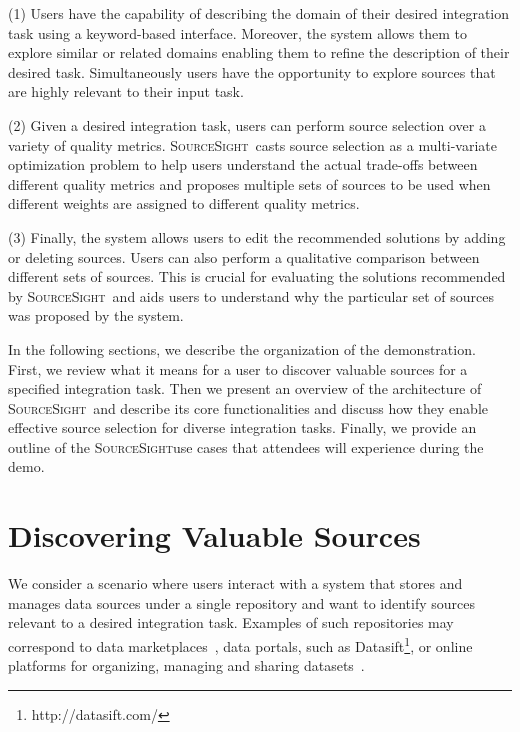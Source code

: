 \documentclass{vldb}
\newcommand\system{\textsc{SourceSight}}
\begin{document}
\vspace{5pt}\noindent (1) Users have the capability of describing the domain of their desired integration task using a keyword-based interface. Moreover, the system allows them to explore similar or related domains enabling them to refine the description of their desired task. Simultaneously users have the opportunity to explore sources that are highly relevant to their input task.

\vspace{5pt}\noindent (2) Given a desired integration task, users can perform source selection over a variety of quality metrics. \system~casts source selection as a multi-variate optimization problem to help users understand the actual trade-offs between different quality metrics and proposes multiple sets of sources to be used when different weights are assigned to different quality metrics. 

\vspace{5pt}\noindent (3) Finally, the system allows users to edit the recommended solutions by adding or deleting sources. Users can also perform a qualitative comparison between different sets of sources. This is crucial for evaluating the solutions recommended by \system~and aids users to understand why the particular set of sources was proposed by the system.

In the following sections, we describe the organization of the demonstration. First, we review what it means for a user to discover valuable sources for a specified integration task. Then we present an overview of the architecture of \system~and describe its core functionalities and discuss how they enable effective source selection for diverse integration tasks. Finally, we provide an outline of the \system use cases that attendees will experience during the demo.

\section{Discovering Valuable Sources}
\label{sec:sources}
We consider a scenario where users interact with a system that stores and manages data sources under a single repository and want to identify sources relevant to a desired integration task. Examples of such repositories may correspond to data marketplaces~\cite{balazinska:vldb11}, data portals, such as Datasift\footnote{http://datasift.com/}, or online platforms for organizing, managing and sharing datasets~\cite{datahub}. 
\end{document}
